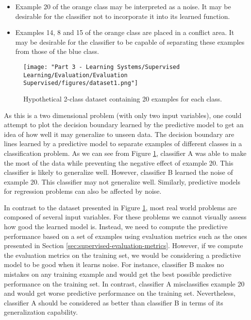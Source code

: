 \begin{itemize}
    \item Example 20 of the orange class may be interpreted as a noise. It may be desirable for the classifier not to incorporate it into its learned function.
    \item Examples 14, 8 and 15 of the orange class are placed in a conflict area. It may be desirable for the classifier to be capable of separating these examples from those of the blue class. %
\end{itemize}


\begin{figure}[h]
    \centering
    \texttt{[image: "Part 3 - Learning Systems/Supervised Learning/Evaluation/Evaluation Supervised/figures/dataset1.png"]}
    \caption{Hypothetical 2-class dataset containing 20 examples for each class.}
    \label{fig:ds1}
\end{figure}


As this is a two dimensional problem (with only two input variables), one could attempt to plot the decision boundary learned by the predictive model to get an idea of how well it may generalize to unseen data. The decision boundary are lines learned by a predictive model to separate examples of different classes in a classification problem. As we can see from Figure \ref{fig:ds1}, classifier A was able to make the most of the data while preventing the negative effect of example 20. This classifier is likely to generalize well. However, classifier B learned the noise of example 20. This classifier may not generalize well. Similarly, predictive models for regression problems can also be affected by noise.

In contrast to the dataset presented in Figure \ref{fig:ds1}, most real world problems are composed of several input variables. For these problems we cannot visually assess how good the learned model is.  Instead, we need to compute the predictive performance based on a set of examples using evaluation metrics such as the ones presented in Section \ref{sec:supervised-evaluation-metrics}. However, if we compute the evaluation metrics on the training set, we would be considering a predictive model to be good when it learns noise. For instance, classifier B makes no mistakes on any training example and would get the best possible predictive performance on the training set. In contrast, classifier A misclassifies example 20 and would get worse predictive performance on the training set. Nevertheless, classifier A should be considered as better than classifier B in terms of its generalization capability. 

